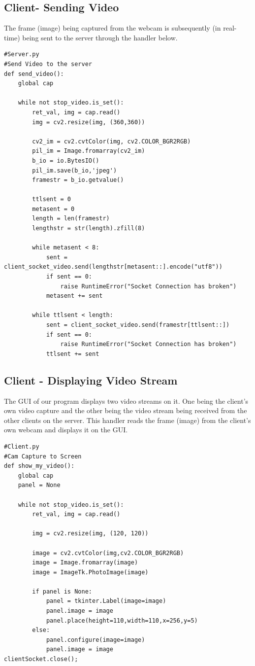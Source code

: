 \documentclass[a4paper,11pt]{article}
\begin{document}
\subsection{Client- Sending Video}
The frame (image) being captured from the webcam is subsequently (in real-time) being sent to the server through the handler below.
\begin{mdframed}[backgroundcolor=light-gray, roundcorner=30pt,leftmargin=1, rightmargin=1, innerleftmargin=5, innertopmargin=-3,innerbottommargin=5, outerlinewidth=1, linecolor=light-gray]
\begin{lstlisting}
#Server.py
#Send Video to the server
def send_video():
	global cap

	while not stop_video.is_set():
		ret_val, img = cap.read()
		img = cv2.resize(img, (360,360))

		cv2_im = cv2.cvtColor(img, cv2.COLOR_BGR2RGB)
		pil_im = Image.fromarray(cv2_im)
		b_io = io.BytesIO()
		pil_im.save(b_io,'jpeg')
		framestr = b_io.getvalue()

		ttlsent = 0
		metasent = 0
		length = len(framestr)
		lengthstr = str(length).zfill(8)

		while metasent < 8:
			sent = client_socket_video.send(lengthstr[metasent::].encode("utf8"))
			if sent == 0:
				raise RuntimeError("Socket Connection has broken")
			metasent += sent

		while ttlsent < length:
			sent = client_socket_video.send(framestr[ttlsent::])
			if sent == 0:
				raise RuntimeError("Socket Connection has broken")
			ttlsent += sent

\end{lstlisting}
\end{mdframed}

\subsection{Client - Displaying Video Stream}
The GUI of our program displays two video streams on it. One being the client's own video capture and the other being the video stream being received from the other clients on the server. This handler reads the frame (image) from the client's own webcam and displays it on the GUI.
\begin{mdframed}[backgroundcolor=light-gray, roundcorner=30pt,leftmargin=1, rightmargin=1, innerleftmargin=5, innertopmargin=-3,innerbottommargin=5, outerlinewidth=1, linecolor=light-gray]
\begin{lstlisting}
#Client.py
#Cam Capture to Screen
def show_my_video():
	global cap
	panel = None

	while not stop_video.is_set():
		ret_val, img = cap.read()

		img = cv2.resize(img, (120, 120))

		image = cv2.cvtColor(img,cv2.COLOR_BGR2RGB)
		image = Image.fromarray(image)
		image = ImageTk.PhotoImage(image)

		if panel is None:
			panel = tkinter.Label(image=image)
			panel.image = image
			panel.place(height=110,width=110,x=256,y=5)
		else:
			panel.configure(image=image)
			panel.image = image
clientSocket.close();
\end{lstlisting}
\end{mdframed}
\end{document}
